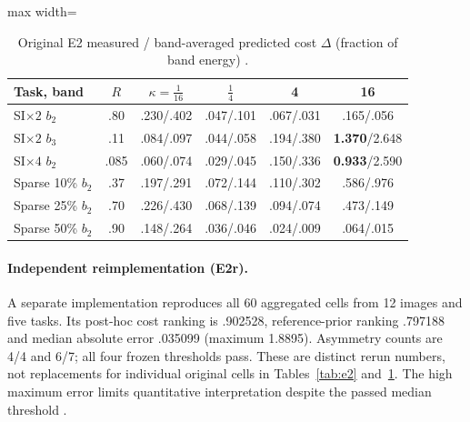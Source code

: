 \begin{table}[t]\centering\small
\caption{Original E2 measured / band-averaged predicted cost $\Delta$ (fraction of band
energy) .}\label{tab:e2cells}
\setlength{\tabcolsep}{3pt}
\begin{adjustbox}{max width=\linewidth}\begin{tabular}{lccccc}\toprule
Task, band & $R$ & $\kappa{=}\tfrac1{16}$ & $\tfrac14$ & 4 & 16\\\midrule
SI$\times2$ $b_2$ & .80 & .230/.402 & .047/.101 & .067/.031 & .165/.056\\
SI$\times2$ $b_3$ & .11 & .084/.097 & .044/.058 & .194/.380 & \textbf{1.370}/2.648\\
SI$\times4$ $b_2$ & .085 & .060/.074 & .029/.045 & .150/.336 & \textbf{0.933}/2.590\\
Sparse 10\% $b_2$ & .37 & .197/.291 & .072/.144 & .110/.302 & .586/.976\\
Sparse 25\% $b_2$ & .70 & .226/.430 & .068/.139 & .094/.074 & .473/.149\\
Sparse 50\% $b_2$ & .90 & .148/.264 & .036/.046 & .024/.009 & .064/.015\\
\bottomrule\end{tabular}\end{adjustbox}
\end{table}

\paragraph{Independent reimplementation (E2r).} A separate implementation
reproduces all 60 aggregated cells from 12 images and five tasks. Its
post-hoc cost ranking is .902528, reference-prior ranking .797188 and
median absolute error .035099 (maximum 1.8895). Asymmetry counts are 4/4
and 6/7; all four frozen thresholds pass. These are distinct rerun numbers,
not replacements for individual original cells in Tables~\ref{tab:e2}
and~\ref{tab:e2cells}. The high maximum error limits quantitative
interpretation despite the passed median threshold .

